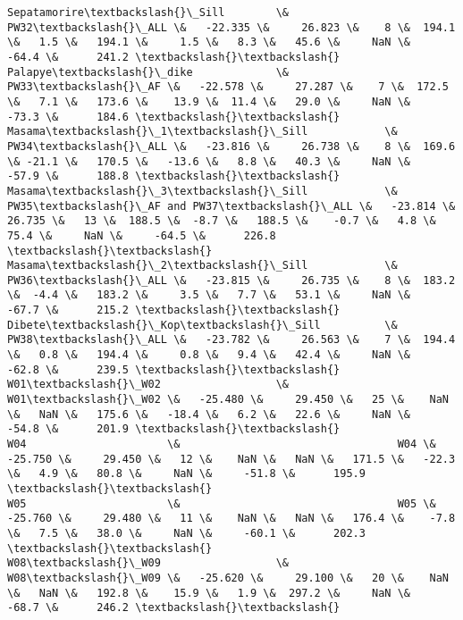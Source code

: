 \documentclass{article}
\begin{document}
\begin{Verbatim}[commandchars=\\\{\}]
Sepatamorire\textbackslash{}\_Sill        \&                             PW32\textbackslash{}\_ALL \&   -22.335 \&     26.823 \&    8 \&  194.1 \&   1.5 \&   194.1 \&     1.5 \&   8.3 \&   45.6 \&     NaN \&     -64.4 \&      241.2 \textbackslash{}\textbackslash{}
Palapye\textbackslash{}\_dike             \&                              PW33\textbackslash{}\_AF \&   -22.578 \&     27.287 \&    7 \&  172.5 \&   7.1 \&   173.6 \&    13.9 \&  11.4 \&   29.0 \&     NaN \&     -73.3 \&      184.6 \textbackslash{}\textbackslash{}
Masama\textbackslash{}\_1\textbackslash{}\_Sill            \&                             PW34\textbackslash{}\_ALL \&   -23.816 \&     26.738 \&    8 \&  169.6 \& -21.1 \&   170.5 \&   -13.6 \&   8.8 \&   40.3 \&     NaN \&     -57.9 \&      188.8 \textbackslash{}\textbackslash{}
Masama\textbackslash{}\_3\textbackslash{}\_Sill            \&                 PW35\textbackslash{}\_AF and PW37\textbackslash{}\_ALL \&   -23.814 \&     26.735 \&   13 \&  188.5 \&  -8.7 \&   188.5 \&    -0.7 \&   4.8 \&   75.4 \&     NaN \&     -64.5 \&      226.8 \textbackslash{}\textbackslash{}
Masama\textbackslash{}\_2\textbackslash{}\_Sill            \&                             PW36\textbackslash{}\_ALL \&   -23.815 \&     26.735 \&    8 \&  183.2 \&  -4.4 \&   183.2 \&     3.5 \&   7.7 \&   53.1 \&     NaN \&     -67.7 \&      215.2 \textbackslash{}\textbackslash{}
Dibete\textbackslash{}\_Kop\textbackslash{}\_Sill          \&                             PW38\textbackslash{}\_ALL \&   -23.782 \&     26.563 \&    7 \&  194.4 \&   0.8 \&   194.4 \&     0.8 \&   9.4 \&   42.4 \&     NaN \&     -62.8 \&      239.5 \textbackslash{}\textbackslash{}
W01\textbackslash{}\_W02                  \&                              W01\textbackslash{}\_W02 \&   -25.480 \&     29.450 \&   25 \&    NaN \&   NaN \&   175.6 \&   -18.4 \&   6.2 \&   22.6 \&     NaN \&     -54.8 \&      201.9 \textbackslash{}\textbackslash{}
W04                      \&                                  W04 \&   -25.750 \&     29.450 \&   12 \&    NaN \&   NaN \&   171.5 \&   -22.3 \&   4.9 \&   80.8 \&     NaN \&     -51.8 \&      195.9 \textbackslash{}\textbackslash{}
W05                      \&                                  W05 \&   -25.760 \&     29.480 \&   11 \&    NaN \&   NaN \&   176.4 \&    -7.8 \&   7.5 \&   38.0 \&     NaN \&     -60.1 \&      202.3 \textbackslash{}\textbackslash{}
W08\textbackslash{}\_W09                  \&                              W08\textbackslash{}\_W09 \&   -25.620 \&     29.100 \&   20 \&    NaN \&   NaN \&   192.8 \&    15.9 \&   1.9 \&  297.2 \&     NaN \&     -68.7 \&      246.2 \textbackslash{}\textbackslash{}

\end{Verbatim}
\end{document}
